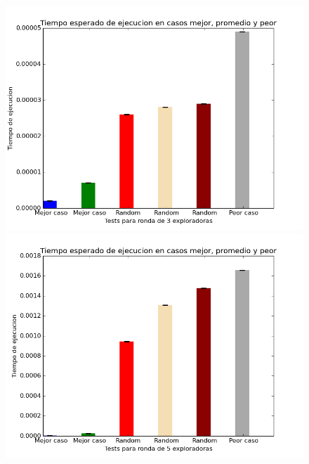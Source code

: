 \documentclass[11pt]{article}
\begin{document}
      \begin{figure}[H]
        \includegraphics[scale=0.4]{tiemposE3}
        \includegraphics[scale=0.4]{tiemposE5}
      \end{figure}
\end{document}
